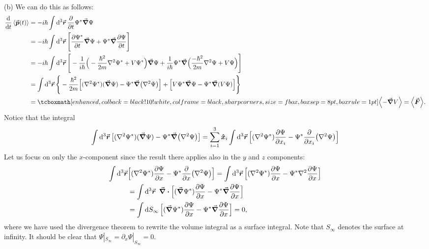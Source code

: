 {(b) We can do this as follows:
\begin{eqnarray}
    \begin{aligned}
        \dv{t} \expval{\va*{p}(t)} &= -i \hbar \int \dd[3]{\va*{r}} \pdv{t} \Psi^{*} \grad \Psi \\
                                   &= -i\hbar \int \dd[3]{\va*{r}} \Bigg[ \pdv{\Psi^{*}}{t} \grad \Psi + \Psi^{*} \grad \pdv{\Psi}{t} \Bigg] \\
                                   &= -i \hbar \int \dd[3]{\va*{r}} \Bigg[ -\frac{1}{i \hbar} \Big( -\frac{\hbar^2}{2m} \laplacian \Psi^{*} + V \Psi^{*} \Big) \grad \Psi + \frac{1}{i \hbar} \Psi^{*} \grad \Big( \frac{-\hbar^2}{2m} \laplacian \Psi + V \Psi \Big) \Bigg] \\
                                   &= \int \dd[3]{\va*{r}} \Bigg\{ -\frac{\hbar^2}{2m} \Big[ (\laplacian \Psi^{*})(\grad \Psi) - \Psi^{*} \grad (\laplacian \Psi) \Big] + \Big[ V \Psi^{*} \grad \Psi - \Psi^{*} \grad (V \Psi) \Big] \Bigg\} \\
                                   &= \eqbox{ \expval{- \grad V} = \expval{\va*{F}} }
    .\end{aligned}
\end{eqnarray}
Notice that the integral
\begin{eqnarray}
    \int \dd[3]{\va*{r}} \big[ (\laplacian \Psi^{*})(\grad \Psi) - \Psi^{*} \grad (\laplacian \Psi) \big] = \sum_{i=1}^{3} \vu*{x}_{i} \int \dd[3]{\va*{r}} \Big[ (\laplacian \Psi^{*}) \pdv{\Psi}{x_{i}} - \Psi^{*} \pdv{x_{i}} (\laplacian \Psi) \Big]
\end{eqnarray}
Let us focus on only the $x$-component since the result there applies also in the $y$ and $z$ components:
\begin{eqnarray}
    \begin{aligned}
        \int \dd[3]{\va*{r}} &\Big[ (\laplacian \Psi^{*}) \pdv{\Psi}{x} - \Psi^{*} \pdv{x} (\laplacian \Psi) \Big] = \int \dd[3]{\va*{r}} \Big[ (\laplacian \Psi^{*}) \pdv{\Psi}{x} - \Psi^{*} \laplacian \pdv{\Psi}{x} \Big] \\
                             &= \int \dd[3]{\va*{r}} ~ \div{ \Big[ (\grad \Psi^{*}) \pdv{\Psi}{x} - \Psi^{*} \grad \pdv{\Psi}{x} \Big] } \\
                             &= \int \dd{S_{\infty}} \Big[ (\grad \Psi^{*}) \pdv{\Psi}{x} - \Psi^{*} \grad \pdv{\Psi}{x} \Big] = 0
    ,\end{aligned}
\end{eqnarray}
where we have used the divergence theorem to rewrite the volume integral as a surface integral.
Note that $S_{\infty}$ denotes the surface at infinity.
It should be clear that $\Psi|_{S_{\infty}} = \partial_{x} \Psi|_{S_\infty} = 0$.

}
